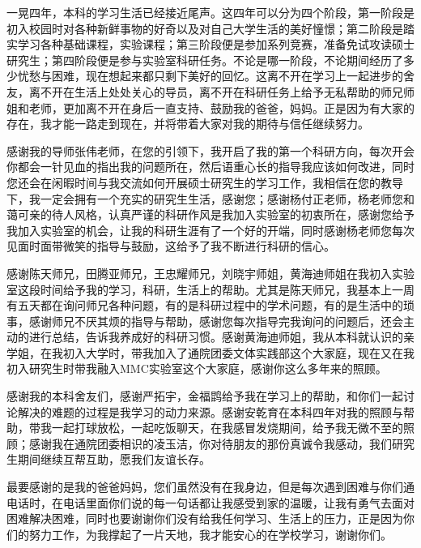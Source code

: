 
\begin{acknowledgments}
    一晃四年，本科的学习生活已经接近尾声。这四年可以分为四个阶段，第一阶段是初入校园时对各种新鲜事物的好奇以及对自己大学生活的美好憧憬；第二阶段是踏实学习各种基础课程，实验课程；第三阶段便是参加系列竞赛，准备免试攻读硕士研究生；第四阶段便是参与实验室科研任务。不论是哪一阶段，不论期间经历了多少忧愁与困难，现在想起来都只剩下美好的回忆。这离不开在学习上一起进步的舍友，离不开在生活上处处关心的导员，离不开在科研任务上给予无私帮助的师兄师姐和老师，更加离不开在身后一直支持、鼓励我的爸爸，妈妈。正是因为有大家的存在，我才能一路走到现在，并将带着大家对我的期待与信任继续努力。

    感谢我的导师张伟老师，在您的引领下，我开启了我的第一个科研方向，每次开会你都会一针见血的指出我的问题所在，然后语重心长的指导我应该如何改进，同时您还会在闲暇时间与我交流如何开展硕士研究生的学习工作，我相信在您的教导下，我一定会拥有一个充实的研究生生活，感谢您；感谢杨付正老师，杨老师您和蔼可亲的待人风格，认真严谨的科研作风是我加入实验室的初衷所在，感谢您给予我加入实验室的机会，让我的科研生涯有了一个好的开端，同时感谢杨老师您每次见面时面带微笑的指导与鼓励，这给予了我不断进行科研的信心。

    感谢陈天师兄，田腾亚师兄，王忠耀师兄，刘晓宇师姐，黄海迪师姐在我初入实验室这段时间给予我的学习，科研，生活上的帮助。尤其是陈天师兄，我基本上一周有五天都在询问师兄各种问题，有的是科研过程中的学术问题，有的是生活中的琐事，感谢师兄不厌其烦的指导与帮助，感谢您每次指导完我询问的问题后，还会主动的进行总结，告诉我养成好的科研习惯。感谢黄海迪师姐，我从本科就认识的亲学姐，在我初入大学时，带我加入了通院团委文体实践部这个大家庭，现在又在我初入研究生时带我融入MMC实验室这个大家庭，感谢你这么多年来的照顾。

    感谢我的本科舍友们，感谢严拓宇，金福鹍给予我在学习上的帮助，和你们一起讨论解决的难题的过程是我学习的动力来源。感谢安乾育在本科四年对我的照顾与帮助，带我一起打球放松，一起吃饭聊天，在我感冒发烧期间，给予我无微不至的照顾；感谢我在通院团委相识的凌玉洁，你对待朋友的那份真诚令我感动，我们研究生期间继续互帮互助，愿我们友谊长存。

    最要感谢的是我的爸爸妈妈，您们虽然没有在我身边，但是每次遇到困难与你们通电话时，在电话里面你们说的每一句话都让我感受到家的温暖，让我有勇气去面对困难解决困难，同时也要谢谢你们没有给我任何学习、生活上的压力，正是因为你们的努力工作，为我撑起了一片天地，我才能安心的在学校学习，谢谢你们。




\end{acknowledgments}


